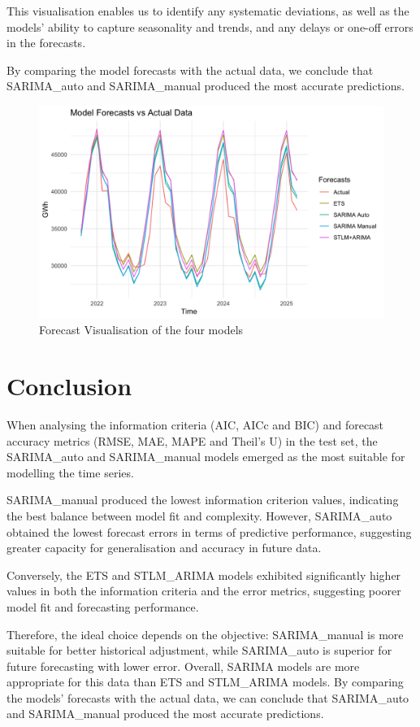 This visualisation enables us to identify any systematic deviations, as well as the models' ability to capture seasonality and trends, and any delays or one-off errors in the forecasts.

By comparing the model forecasts with the actual data, we conclude that SARIMA\_auto and SARIMA\_manual produced the most accurate predictions.

\begin{figure}[H]
    \centering
    \includegraphics[width=1\linewidth]{images/grafico_fixe.png}
    \caption{Forecast Visualisation of the four models}
    \label{fig:enter-label}
\end{figure}

\section{Conclusion}
When analysing the information criteria (AIC, AICc and BIC) and forecast accuracy metrics (RMSE, MAE, MAPE and Theil's U) in the test set, the SARIMA\_auto and SARIMA\_manual models emerged as the most suitable for modelling the time series.

SARIMA\_manual produced the lowest information criterion values, indicating the best balance between model fit and complexity. However, SARIMA\_auto obtained the lowest forecast errors in terms of predictive performance, suggesting greater capacity for generalisation and accuracy in future data.

Conversely, the ETS and STLM\_ARIMA models exhibited significantly higher values in both the information criteria and the error metrics, suggesting poorer model fit and forecasting performance.

Therefore, the ideal choice depends on the objective: SARIMA\_manual is more suitable for better historical adjustment, while SARIMA\_auto is superior for future forecasting with lower error. Overall, SARIMA models are more appropriate for this data than ETS and STLM\_ARIMA models. By comparing the models' forecasts with the actual data, we can conclude that SARIMA\_auto and SARIMA\_manual produced the most accurate predictions.